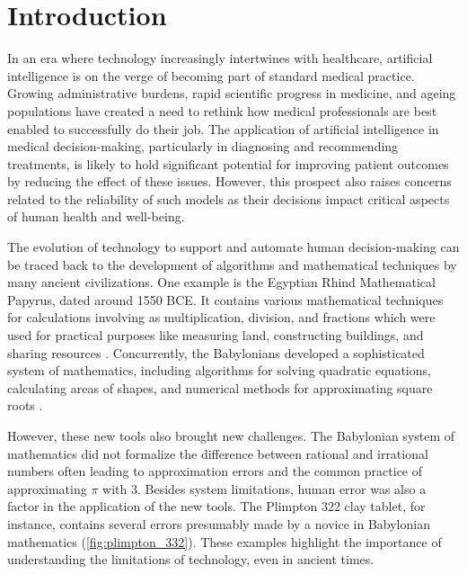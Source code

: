 
\chapter[introduction]{Introduction}\label{chp:introduction}


In an era where technology increasingly intertwines with healthcare, artificial intelligence is on the verge of becoming part of standard medical practice. 
Growing administrative burdens, rapid scientific progress in medicine, and ageing populations have created a need to rethink how medical professionals are best enabled to successfully do their job. 
The application of artificial intelligence in medical decision-making, particularly in diagnosing and recommending treatments, is likely to hold significant potential for improving patient outcomes by reducing the effect of these issues. 
However, this prospect also raises concerns related to the reliability of such models as their decisions impact critical aspects of human health and well-being.

The evolution of technology to support and automate human decision-making can be traced back to the development of algorithms and mathematical techniques by many ancient civilizations. 
One example is the Egyptian Rhind Mathematical Papyrus, dated around 1550 BCE. It contains various mathematical techniques for calculations involving as multiplication, division, and fractions which were used for practical purposes like measuring land, constructing buildings, and sharing resources \cite{georges_universal_2001}. 
Concurrently, the Babylonians developed a sophisticated system of mathematics, including algorithms for solving quadratic equations, calculating areas of shapes, and numerical methods for approximating square roots \cite{fowler_square_1998}. 

However, these new tools also brought new challenges. The Babylonian system of mathematics did not formalize the difference between rational and irrational numbers often leading to approximation errors and the common practice of approximating $\pi$ with 3. Besides system limitations, human error was also a factor in the application of the new tools. The Plimpton 322 clay tablet, for instance, contains several errors presumably made by a novice in Babylonian mathematics \cite{britton_plimpton_2011} (\cref{fig:plimpton_332}).
These examples highlight the importance of understanding the limitations of technology, even in ancient times.

